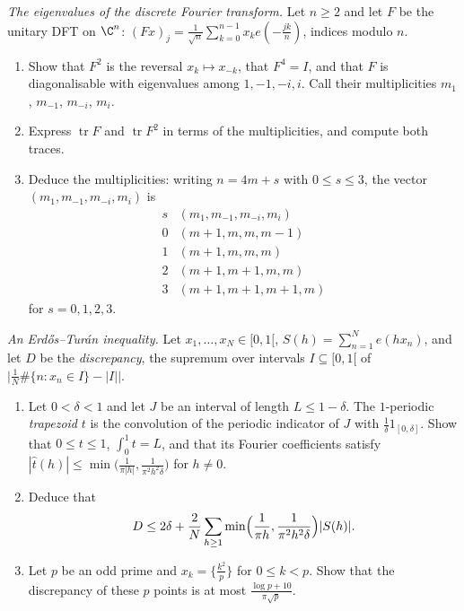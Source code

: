 \begin{exercise}[$\star\star\star$]\label{pb:dftspectrum}
\emph{The eigenvalues of the discrete Fourier transform.} Let $n\ge2$ and let $F$ be the unitary DFT on $\C^n$:
$(Fx)_j=\frac1{\sqrt n}\sum_{k=0}^{n-1}x_ke(-\frac{jk}n)$, indices modulo $n$.
\begin{enumerate}[label=(\alph*)]
\item Show that $F^2$ is the reversal $x_k\mapsto x_{-k}$, that $F^4=I$, and that $F$ is diagonalisable with eigenvalues among
$1,-1,-i,i$. Call their multiplicities $m_1$, $m_{-1}$, $m_{-i}$, $m_i$.
\item Express $\operatorname{tr}F$ and $\operatorname{tr}F^2$ in terms of the multiplicities, and compute both traces.
\item Deduce the multiplicities: writing $n=4m+s$ with $0\le s\le3$, the vector $(m_1,m_{-1},m_{-i},m_i)$ is
\[
\begin{array}{c|c}
s&(m_1,m_{-1},m_{-i},m_i)\\\hline
0&(m+1,m,m,m-1)\\
1&(m+1,m,m,m)\\
2&(m+1,m+1,m,m)\\
3&(m+1,m+1,m+1,m)
\end{array}
\]
for $s=0,1,2,3$.
\end{enumerate}
\end{exercise}

\begin{exercise}[$\star\star\star$]\label{pb:erdosturan}
\emph{An Erdős--Turán inequality.} Let $x_1,\dots,x_N\in[0,1[$, $S(h)=\sum_{n=1}^Ne(hx_n)$, and let $D$ be the \emph{discrepancy}, the
supremum over intervals $I\subseteq[0,1[$ of $\bigl|\frac1N\#\{n:x_n\in I\}-|I|\bigr|$.
\begin{enumerate}[label=(\alph*)]
\item Let $0<\delta<1$ and let $J$ be an interval of length $L\le1-\delta$. The $1$-periodic \emph{trapezoid} $t$ is the convolution
of the periodic indicator of $J$ with $\frac1\delta1_{[0,\delta]}$. Show that $0\le t\le1$, $\int_0^1t=L$, and that its Fourier
coefficients satisfy $|\hat t(h)|\le\min\bigl(\frac1{\pi|h|},\frac1{\pi^2h^2\delta}\bigr)$ for $h\ne0$.
\item Deduce that
\[
D\le2\delta+\frac2N\sum_{h\ge1}\min\Bigl(\frac1{\pi h},\frac1{\pi^2h^2\delta}\Bigr)|S(h)|.
\]
\item Let $p$ be an odd prime and $x_k=\{\frac{k^2}p\}$ for $0\le k<p$. Show that the discrepancy of these $p$ points is at most
$\frac{\log p+10}{\pi\sqrt p}$.
\end{enumerate}
\end{exercise}

